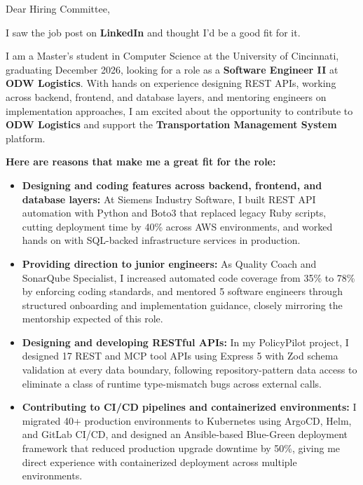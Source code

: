 \documentclass[11pt]{letter}
\date{}
\begin{document}
\begin{letter}{}

\opening{Dear Hiring Committee,}

I saw the job post on \textbf{LinkedIn} and thought I'd be a good fit for it.

I am a Master's student in Computer Science at the University of Cincinnati, graduating December 2026, looking for a role as a \textbf{Software Engineer II} at \textbf{ODW Logistics}. With hands on experience designing REST APIs, working across backend, frontend, and database layers, and mentoring engineers on implementation approaches, I am excited about the opportunity to contribute to \textbf{ODW Logistics} and support the \textbf{Transportation Management System} platform.

\textbf{Here are reasons that make me a great fit for the role:}

\begin{itemize}[leftmargin=*, itemsep=0.45em]
    \item \textbf{Designing and coding features across backend, frontend, and database layers:} At Siemens Industry Software, I built REST API automation with Python and Boto3 that replaced legacy Ruby scripts, cutting deployment time by 40\% across AWS environments, and worked hands on with SQL-backed infrastructure services in production.

    \item \textbf{Providing direction to junior engineers:} As Quality Coach and SonarQube Specialist, I increased automated code coverage from 35\% to 78\% by enforcing coding standards, and mentored 5 software engineers through structured onboarding and implementation guidance, closely mirroring the mentorship expected of this role.

    \item \textbf{Designing and developing RESTful APIs:} In my PolicyPilot project, I designed 17 REST and MCP tool APIs using Express 5 with Zod schema validation at every data boundary, following repository-pattern data access to eliminate a class of runtime type-mismatch bugs across external calls.

    \item \textbf{Contributing to CI/CD pipelines and containerized environments:} I migrated 40+ production environments to Kubernetes using ArgoCD, Helm, and GitLab CI/CD, and designed an Ansible-based Blue-Green deployment framework that reduced production upgrade downtime by 50\%, giving me direct experience with containerized deployment across multiple environments.


\end{itemize}
\end{letter}
\end{document}
